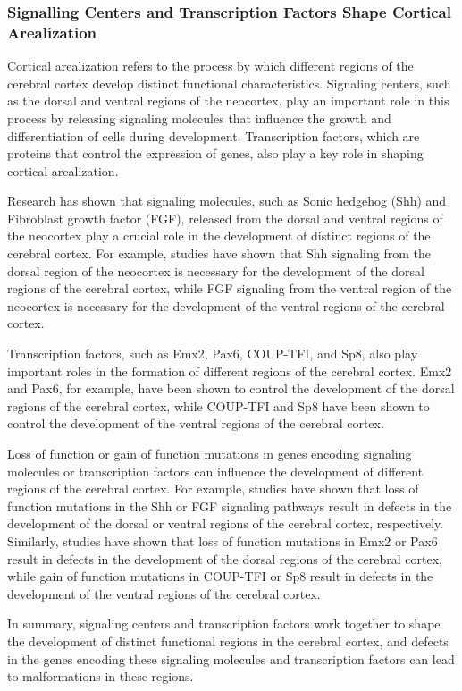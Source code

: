 \begin{itemize}
\begin{itemize}
\subsubsection{Signalling Centers and Transcription Factors Shape Cortical Arealization}


Cortical arealization refers to the process by which different regions of the cerebral cortex develop distinct functional characteristics. Signaling centers, such as the dorsal and ventral regions of the neocortex, play an important role in this process by releasing signaling molecules that influence the growth and differentiation of cells during development. Transcription factors, which are proteins that control the expression of genes, also play a key role in shaping cortical arealization.

Research has shown that signaling molecules, such as Sonic hedgehog (Shh) and Fibroblast growth factor (FGF), released from the dorsal and ventral regions of the neocortex play a crucial role in the development of distinct regions of the cerebral cortex. For example, studies have shown that Shh signaling from the dorsal region of the neocortex is necessary for the development of the dorsal regions of the cerebral cortex, while FGF signaling from the ventral region of the neocortex is necessary for the development of the ventral regions of the cerebral cortex.

Transcription factors, such as Emx2, Pax6, COUP-TFI, and Sp8, also play important roles in the formation of different regions of the cerebral cortex. Emx2 and Pax6, for example, have been shown to control the development of the dorsal regions of the cerebral cortex, while COUP-TFI and Sp8 have been shown to control the development of the ventral regions of the cerebral cortex.

Loss of function or gain of function mutations in genes encoding signaling molecules or transcription factors can influence the development of different regions of the cerebral cortex. For example, studies have shown that loss of function mutations in the Shh or FGF signaling pathways result in defects in the development of the dorsal or ventral regions of the cerebral cortex, respectively. Similarly, studies have shown that loss of function mutations in Emx2 or Pax6 result in defects in the development of the dorsal regions of the cerebral cortex, while gain of function mutations in COUP-TFI or Sp8 result in defects in the development of the ventral regions of the cerebral cortex.

In summary, signaling centers and transcription factors work together to shape the development of distinct functional regions in the cerebral cortex, and defects in the genes encoding these signaling molecules and transcription factors can lead to malformations in these regions.


\end{itemize}
\end{itemize}
